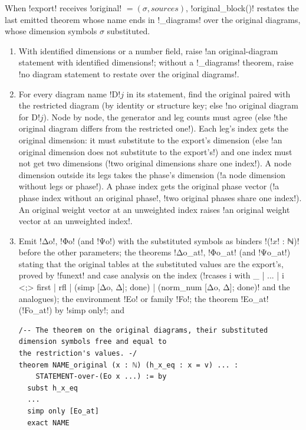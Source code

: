 {When \py!export! receives \py!original! $=(\sigma, \textit{sources})$, \py!original_block()!
restates the last emitted theorem whose name ends in \code!_diagrams! over the original diagrams,
whose dimension symbols $\sigma$ substituted.
\begin{enumerate}
\item With identified dimensions or a number field, raise
  \code!an original-diagram statement with identified dimensions!; without a
  \code!_diagrams! theorem, raise \code!no diagram statement to restate over the original diagrams!.
\item For every diagram name \code!D!$j$ in its statement, find the original paired with the
  restricted diagram (by identity or structure key; else \code!no original diagram for D!$j$).
  Node by node, the generator and leg counts must agree (else
  \code!the original diagram differs from the restricted one!). Each leg's index gets the
  original dimension: it must substitute to the export's dimension (else
  \code!an original dimension does not substitute to the export's!) and one index must not get two
  dimensions (\code!two original dimensions share one index!). A node dimension outside its legs
  takes the phase's dimension (\code!a node dimension without legs or phase!). A phase index gets
  the original phase vector (\code!a phase index without an original phase!,
  \code!two original phases share one index!). An original weight vector at an unweighted index
  raises \code!an original weight vector at an unweighted index!.
\item Emit \leanx!Δo!, \leanx!Φo! (and \leanx!Ψo!) with the substituted symbols as binders
  \code!(!$x$\code! : ℕ)! before the other parameters; the theorems \leanx!Δo_at!, \leanx!Φo_at!
  (and \leanx!Ψo_at!) stating that the original tables at the substituted values are the
  export's, proved by \code!funext! and case analysis on the index
  (\leanx!rcases i with _ | ... | i <;> first | rfl | (simp [Δo, Δ]; done) | (norm_num [Δo, Δ]; done)!
  and the analogues); the environment \code!Eo! or family \code!Fo!; the theorem
  \code!Eo_at! (\code!Fo_at!) by \code!simp only!; and
\begin{lstlisting}[style=grammar]
/-- The theorem on the original diagrams, their substituted dimension symbols free and equal to
the restriction's values. -/
theorem NAME_original (x : ℕ) (h_x_eq : x = v) ... :
    STATEMENT-over-(Eo x ...) := by
  subst h_x_eq
  ...
  simp only [Eo_at]
  exact NAME
\end{lstlisting}
\end{enumerate}

}
